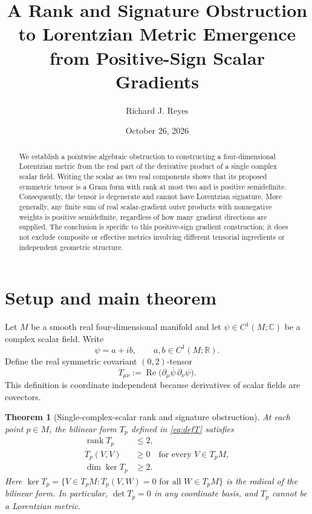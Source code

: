 \documentclass[11pt]{article}
\title{A Rank and Signature Obstruction to Lorentzian Metric Emergence\\
from Positive-Sign Scalar Gradients}
\author{Richard J. Reyes}
\date{October 26, 2026}
\newtheorem{theorem}{Theorem}
\theoremstyle{remark}
\newcommand{\rank}{\operatorname{rank}}
\newcommand{\RePart}{\operatorname{Re}}
\begin{document}
\maketitle

\begin{abstract}
We establish a pointwise algebraic obstruction to constructing a four-dimensional
Lorentzian metric from the real part of the derivative product of a single
complex scalar field.  Writing the scalar as two real components shows that
its proposed symmetric tensor is a Gram form with rank at most two and is
positive semidefinite.  Consequently, the tensor is degenerate and cannot
have Lorentzian signature.  More generally, any finite sum of real
scalar-gradient outer products with nonnegative weights is positive
semidefinite, regardless of how many gradient directions are supplied.
The conclusion is specific to this positive-sign gradient construction;
it does not exclude composite or effective metrics involving different
tensorial ingredients or independent geometric structure.
\end{abstract}

\section{Setup and main theorem}

Let $M$ be a smooth real four-dimensional manifold and let
$\psi\in C^1(M;\mathbb C)$ be a complex scalar field.  Write
\begin{equation}
  \psi=a+ib, \qquad a,b\in C^1(M;\mathbb R).
\end{equation}
Define the real symmetric covariant $(0,2)$-tensor
\begin{equation}\label{eq:defT}
  T_{\mu\nu}
   :=\RePart\bigl(\partial_\mu\overline{\psi}\,
                         \partial_\nu\psi\bigr).
\end{equation}
This definition is coordinate independent because derivatives of scalar
fields are covectors.

\begin{theorem}[Single-complex-scalar rank and signature obstruction]
\label{thm:single}
At each point $p\in M$, the bilinear form $T_p$ defined in
\eqref{eq:defT} satisfies
\begin{align}
  \rank T_p &\leq 2, \label{eq:rankbound}\\
  T_p(V,V)&\geq 0 \quad\text{for every }V\in T_pM, \label{eq:psd}\\
  \dim\ker T_p&\geq 2. \label{eq:kernelbound}
\end{align}
Here $\ker T_p=\{V\in T_pM:T_p(V,W)=0\text{ for all }W\in T_pM\}$
is the radical of the bilinear form.  In particular, $\det T_p=0$
in any coordinate basis, and $T_p$ cannot be a Lorentzian metric.
\end{theorem}
\end{document}
